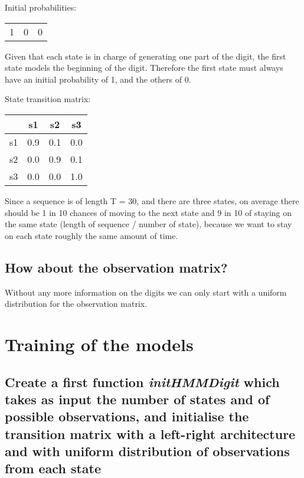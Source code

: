 \documentclass[a4paper]{article}
\begin{document}
Initial probabilities: \newline

\begin{tabular}{ c | c | c }
  1 & 0 & 0 \\
\end{tabular}

\hspace{20mm}
\linebreak
Given that each state is in charge of generating one part of the digit, the first state models the beginning of the digit. Therefore the first state must always have an initial probability of 1, and the others of 0. \newline

State transition matrix: \newline

\begin{tabular}{ c | c | c | c }
  & s1 & s2 & s3 \\
  \hline
  s1 & 0.9 & 0.1 & 0.0 \\
  \hline
  s2 & 0.0 & 0.9 & 0.1\\
  \hline
  s3 & 0.0 & 0.0 & 1.0 \\
\end{tabular}

\hspace{20mm}
\linebreak
Since a sequence is of length T = 30, and there are three states, on average there should be 1 in 10 chances of moving to the next state and 9 in 10 of staying on the same state (length of sequence / number of state), because we want to stay on each state roughly the same amount of time. \newline

\subsection{How about the observation matrix?}

Without any more information on the digits we can only start with a uniform distribution for the observation matrix.

\section{Training of the models}

\subsection{Create a first function {\it initHMMDigit} which takes as input the number of states and of possible observations, and initialise the transition matrix with a left-right architecture and with uniform distribution of observations from each state}
\end{document}
